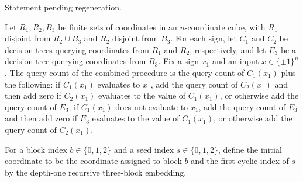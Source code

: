 \begin{theorem}
\label{FABL.queryCount_depthTwoFinishDifferent}
\leanok
{}
Statement pending regeneration.
\end{theorem}

\begin{theorem}
\label{FABL.queryCount_depthTwoFinishEqual}
\leanok
{}
Let $R_1,R_2,B_3$ be finite sets of coordinates in an $n$-coordinate cube, with $R_1$
disjoint from $R_2\cup B_3$ and $R_2$ disjoint from $B_3$. For each sign, let $C_1$ and
$C_2$ be decision trees querying coordinates from $R_1$ and $R_2$, respectively, and let
$E_3$ be a decision tree querying coordinates from $B_3$. Fix a sign $x_1$ and an input
$x\in\{\pm1\}^n$. The query count of the combined procedure is the query count of
$C_1(x_1)$ plus the following: if $C_1(x_1)$ evaluates to $x_1$, add the query count of
$C_2(x_1)$ and then add zero if $C_2(x_1)$ evaluates to the value of $C_1(x_1)$, or
otherwise add the query count of $E_3$; if $C_1(x_1)$ does not evaluate to $x_1$, add
the query count of $E_3$ and then add zero if $E_3$ evaluates to the value of
$C_1(x_1)$, or otherwise add the query count of $C_2(x_1)$.
\end{theorem}

\begin{definition}
\label{FABL.depthTwoInitialCoordinate}
\leanok
{}
For a block index $b\in\{0,1,2\}$ and a seed index $s\in\{0,1,2\}$, define the initial
coordinate to be the coordinate assigned to block $b$ and the first cyclic index of $s$
by the depth-one recursive three-block embedding.
\end{definition}

